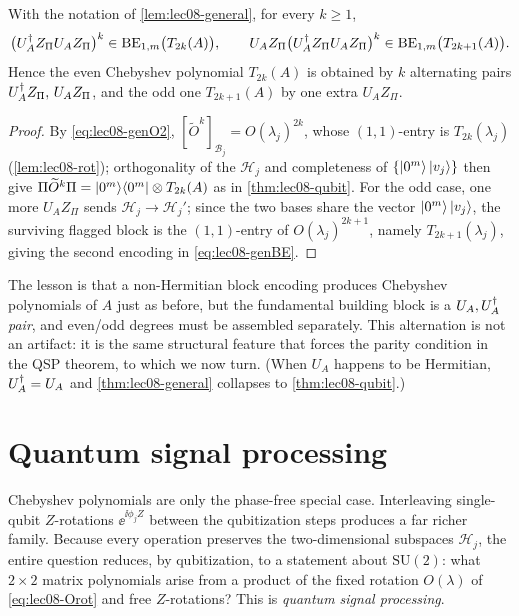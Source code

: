 \begin{theorem}
\label{thm:lec08-general}
With the notation of \cref{lem:lec08-general}, for every $k\ge1$,
\begin{equation}
  \bigl(U_A^{\dagger} Z_\Pi U_A Z_\Pi\bigr)^k\in\mathrm{BE}_{1,m}\bigl(T_{2k}(A)\bigr),
  \qquad
  U_A Z_\Pi\bigl(U_A^{\dagger} Z_\Pi U_A Z_\Pi\bigr)^k\in\mathrm{BE}_{1,m}\bigl(T_{2k+1}(A)\bigr).
  \label{eq:lec08-genBE}
\end{equation}
Hence the even Chebyshev polynomial $T_{2k}(A)$ is obtained by $k$ alternating pairs
$U_A^{\dagger} Z_\Pi,\,U_A Z_\Pi$, and the odd one $T_{2k+1}(A)$ by one extra $U_A Z_\Pi$.
\end{theorem}

\begin{proof}
By \eqref{eq:lec08-genO2}, $[\widetilde O^k]_{\mathcal B_j}=O(\lambda_j)^{2k}$, whose
$(1,1)$-entry is $T_{2k}(\lambda_j)$ (\cref{lem:lec08-rot}); orthogonality of the
$\mathcal H_j$ and completeness of $\{\ket{0^m}\ket{v_j}\}$ then give
$\Pi\widetilde O^k\Pi=\ket{0^m}\!\bra{0^m}\otimes T_{2k}(A)$ as in \cref{thm:lec08-qubit}. For
the odd case, one more $U_A Z_\Pi$ sends $\mathcal H_j\to\mathcal H_j'$; since the two
bases share the vector $\ket{0^m}\ket{v_j}$, the surviving flagged block is the
$(1,1)$-entry of $O(\lambda_j)^{2k+1}$, namely $T_{2k+1}(\lambda_j)$, giving the
second encoding in \eqref{eq:lec08-genBE}.
\end{proof}

The lesson is that a non-Hermitian block encoding produces Chebyshev polynomials of
$A$ just as before, but the fundamental building block is a $U_A,U_A^{\dagger}$
\emph{pair}, and even/odd degrees must be assembled separately. This alternation is
not an artifact: it is the same structural feature that forces the parity condition
in the QSP theorem, to which we now turn. (When $U_A$ happens to be Hermitian,
$U_A^{\dagger}=U_A$ and \cref{thm:lec08-general} collapses to \cref{thm:lec08-qubit}.)

\section{Quantum signal processing}
\label{sec:lec08-4}

Chebyshev polynomials are only the phase-free special case. Interleaving
single-qubit $Z$-rotations $\ee^{\ii\phi_j Z}$ between the qubitization steps
produces a far richer family. Because every operation preserves the
two-dimensional subspaces $\mathcal H_j$, the entire question reduces, by
qubitization, to a statement about $\mathrm{SU}(2)$: what $2\times2$ matrix
polynomials arise from a product of the fixed rotation $O(\lambda)$ of
\eqref{eq:lec08-Orot} and free $Z$-rotations? This is \emph{quantum signal
processing}.

